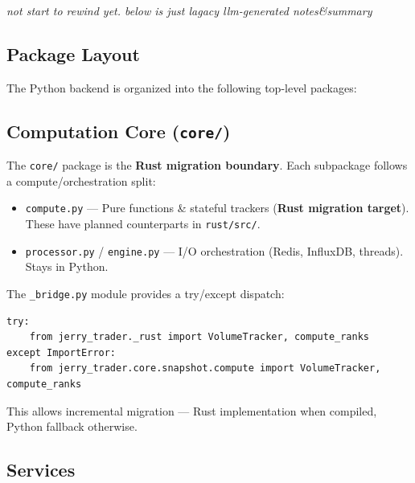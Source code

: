 \documentclass[a4paper, 11pt]{article}
\begin{document}
\emph{not start to rewind yet. below is just lagacy llm-generated notes\&summary}

\subsection{Package Layout}
The Python backend is organized into the following top-level packages:

\subsection{Computation Core (\texttt{core/})}
The \texttt{core/} package is the \textbf{Rust migration boundary}. Each subpackage follows a compute/orchestration split:

\begin{itemize}
    \item \texttt{compute.py} --- Pure functions \& stateful trackers (\textbf{Rust migration target}). These have planned counterparts in \texttt{rust/src/}.
    \item \texttt{processor.py} / \texttt{engine.py} --- I/O orchestration (Redis, InfluxDB, threads). Stays in Python.
\end{itemize}

The \texttt{\_bridge.py} module provides a try/except dispatch:
\begin{Verbatim}[breaklines=true]
try:
    from jerry_trader._rust import VolumeTracker, compute_ranks
except ImportError:
    from jerry_trader.core.snapshot.compute import VolumeTracker, compute_ranks
\end{Verbatim}

\noindent This allows incremental migration --- Rust implementation when compiled, Python fallback otherwise.

\subsection{Services}
\end{document}
